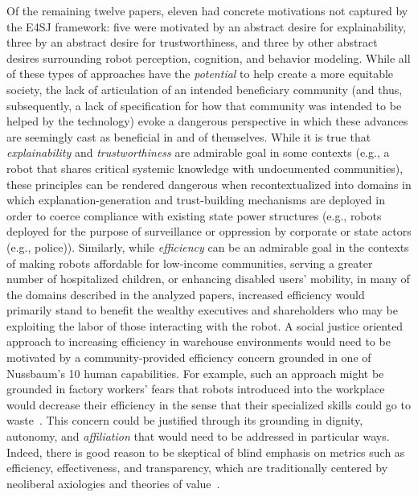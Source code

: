 \documentclass[letterpaper]{article} %
\begin{document}
Of the remaining twelve papers, eleven had concrete motivations not captured by the E4SJ framework: five were motivated by an abstract desire for explainability, three by an abstract desire for trustworthiness, and three by other abstract desires surrounding robot perception, cognition, and behavior modeling. While all of these types of approaches have the \textit{potential} to help create a more equitable society, the lack of articulation of an intended beneficiary community (and thus, subsequently, a lack of specification for how that community was intended to be helped by the technology) evoke a dangerous perspective in which these advances are seemingly cast as beneficial in and of themselves.
%
While it is true that \textit{explainability} and \textit{trustworthiness} are admirable goal in some contexts (e.g., a robot that shares critical systemic knowledge with undocumented communities), these principles can be rendered dangerous when recontextualized into domains in which explanation-generation and trust-building mechanisms are deployed in order to coerce compliance with existing state power structures (e.g., robots deployed for the purpose of surveillance or oppression by corporate or state actors (e.g., police)).
%
Similarly, while \textit{efficiency} can be an admirable goal in the contexts of making robots affordable for low-income communities, serving a greater number of hospitalized children, or enhancing disabled users' mobility, in many of the domains described in the analyzed papers, increased efficiency would primarily stand to benefit the wealthy executives and shareholders who may be exploiting the labor of those interacting with the robot. A social justice oriented approach to increasing efficiency in warehouse environments would need to be motivated by a community-provided efficiency concern grounded in one of Nussbaum's 10 human capabilities. For example, such an approach might be grounded in factory workers' fears that robots introduced into the workplace would decrease their efficiency in the sense that their specialized skills could go to waste~\cite{meissner2020friend}. This concern could be justified through its grounding in dignity, autonomy, and \textit{affiliation} that would need to be addressed in particular ways.
%
Indeed, there is good reason to be skeptical of blind emphasis on metrics such as efficiency, effectiveness, and transparency, which are traditionally centered by neoliberal axiologies and theories of value~\cite{power2003evaluating,van2014neoliberal}.
\end{document}
